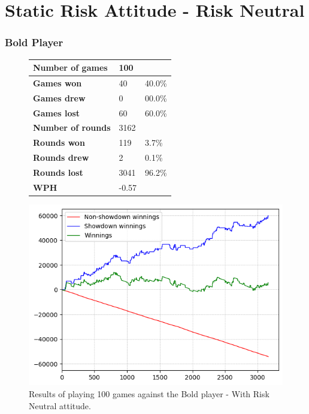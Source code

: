 \section{Static Risk Attitude - Risk Neutral}

\subsubsection{Bold Player}
\begin{figure}[H]
    \centering
    \begin{minipage}{\textwidth}
        \begin{minipage}{0.40\textwidth}
            \begin{tabular}{|l|l|l|}
                \hline
                \textbf{Number of games}  & 100   &        \\ \hline
                \textbf{Games won}        & 40    & 40.0\% \\ \hline
                \textbf{Games drew}       & 0     & 00.0\%  \\ \hline
                \textbf{Games lost}       & 60    & 60.0\% \\ \hline
                \textbf{Number of rounds} & 3162  &        \\ \hline
                \textbf{Rounds won}       & 119   & 3.7\%  \\ \hline
                \textbf{Rounds drew}      & 2     & 0.1\%  \\ \hline
                \textbf{Rounds lost}      & 3041  & 96.2\% \\ \hline
                \textbf{WPH}              & -0.57 &        \\ \hline
            \end{tabular}
        \end{minipage}
        \hspace{0.05\textwidth}
        \begin{minipage}{0.5\textwidth}
            \includegraphics[width=\textwidth]{graphics/risk-neutral/bold.png}
        \end{minipage}
    \end{minipage}
    \caption{Results of playing 100 games against the Bold player - With Risk Neutral attitude.}
    \label{fig:results_neutral_bold}
\end{figure}


